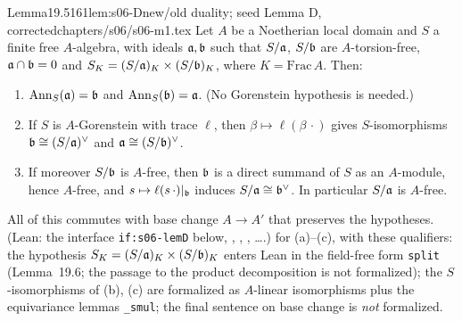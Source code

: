 \begin{quoted}{Lemma}{19.5}{161}{lem:s06-D}{new/old duality; seed Lemma D, corrected}{chapters/s06/s06-m1.tex}\label{rpt:lem:s06-D}
Let $A$ be a Noetherian local domain and $S$ a finite free $A$-algebra, with ideals $\mathfrak{a},\mathfrak{b}$ such that $S/\mathfrak{a}$, $S/\mathfrak{b}$ are
$A$-torsion-free, $\mathfrak{a}\cap\mathfrak{b}=0$ and $S_K=(S/\mathfrak{a})_K\times(S/\mathfrak{b})_K$, where $K=\mathrm{Frac}\,A$. Then:
\begin{enumerate}[label=(\alph*)]
\item $\operatorname{Ann}_S(\mathfrak{a})=\mathfrak{b}$ and $\operatorname{Ann}_S(\mathfrak{b})=\mathfrak{a}$. (No Gorenstein hypothesis is needed.)
\item If $S$ is $A$-Gorenstein with trace $\ell$, then $\beta\mapsto\ell(\beta\,\cdot)$ gives $S$-isomorphisms
  $\mathfrak{b}\cong(S/\mathfrak{a})^\vee$ and $\mathfrak{a}\cong(S/\mathfrak{b})^\vee$.
\item If moreover $S/\mathfrak{b}$ is $A$-free, then $\mathfrak{b}$ is a direct summand of $S$ as an $A$-module, hence $A$-free, and
  $s\mapsto\ell(s\,\cdot)|_{\mathfrak{b}}$ induces $S/\mathfrak{a}\cong\mathfrak{b}^\vee$. In particular $S/\mathfrak{a}$ is $A$-free.
\end{enumerate}
All of this commutes with base change $A\to A'$ that preserves the hypotheses. \stproved{}
(Lean: the interface \texttt{if:s06-lemD} below, , , , \dots.)
\stformalized{} for (a)--(c), with these qualifiers: the hypothesis $S_K=(S/\mathfrak{a})_K\times(S/\mathfrak{b})_K$ enters Lean in the field-free form \texttt{split} (Lemma~19.6; the passage to the product decomposition is not formalized); the $S$-isomorphisms of (b), (c) are formalized as $A$-linear isomorphisms plus the equivariance lemmas \texttt{\_smul}; the final sentence on base change is \emph{not} formalized.
\end{quoted}

